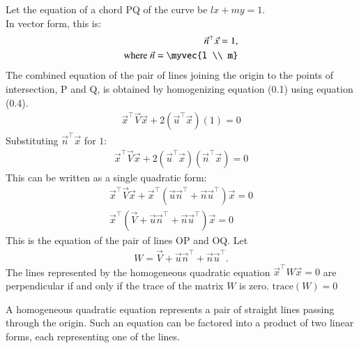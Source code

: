 \documentclass[journal]{IEEEtran}
\begin{document}
Let the equation of a chord PQ of the curve be $lx + my = 1 $.\\
In vector form, this is:
\begin{align}
\vec{n}^\top\vec{x} = 1,\\
\text{where } \vec{n} = \myvec{l \\ m}
\end{align}
The combined equation of the pair of lines joining the origin to the points of intersection, P and Q, is obtained by homogenizing equation (0.1) using equation (0.4).
\begin{align}
\vec{x}^\top {\vec{V}}\vec{x} + 2(\vec{u}^\top\vec{x})(1) = 0 
\end{align}
Substituting $\vec{n}^\top\vec{x}$ for $1$:
\begin{align}
\vec{x}^\top {\vec{V}}\vec{x} + 2(\vec{u}^\top\vec{x})(\vec{n}^\top\vec{x}) = 0 
\end{align}
This can be written as a single quadratic form:
\begin{align}
\vec{x}^\top {\vec{V}}\vec{x} + \vec{x}^\top(\vec{u}\vec{n}^\top + \vec{n}\vec{u}^\top)\vec{x} = 0\\
\vec{x}^\top( {\vec{V}} + \vec{u}\vec{n}^\top + \vec{n}\vec{u}^\top)\vec{x} = 0
\end{align}
This is the equation of the pair of lines OP and OQ. Let 
\begin{align}
{W} =  {\vec{V}} + \vec{u}\vec{n}^\top + \vec{n}\vec{u}^\top.
\end{align}
The lines represented by the homogeneous quadratic equation $\vec{x}^\top {W}\vec{x} = 0$ are perpendicular if and only if the trace of the matrix $ {W}$ is zero.
$\text{trace}( {W}) = 0 $

A homogeneous quadratic equation represents a pair of straight lines passing through the origin. Such an equation can be factored into a product of two linear forms, each representing one of the lines.
\end{document}
